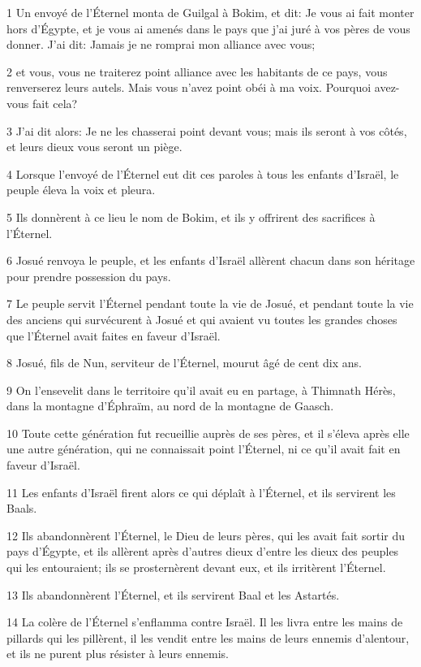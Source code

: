\par 1 Un envoyé de l'Éternel monta de Guilgal à Bokim, et dit: Je vous ai fait monter hors d'Égypte, et je vous ai amenés dans le pays que j'ai juré à vos pères de vous donner. J'ai dit: Jamais je ne romprai mon alliance avec vous;
\par 2 et vous, vous ne traiterez point alliance avec les habitants de ce pays, vous renverserez leurs autels. Mais vous n'avez point obéi à ma voix. Pourquoi avez-vous fait cela?
\par 3 J'ai dit alors: Je ne les chasserai point devant vous; mais ils seront à vos côtés, et leurs dieux vous seront un piège.
\par 4 Lorsque l'envoyé de l'Éternel eut dit ces paroles à tous les enfants d'Israël, le peuple éleva la voix et pleura.
\par 5 Ils donnèrent à ce lieu le nom de Bokim, et ils y offrirent des sacrifices à l'Éternel.
\par 6 Josué renvoya le peuple, et les enfants d'Israël allèrent chacun dans son héritage pour prendre possession du pays.
\par 7 Le peuple servit l'Éternel pendant toute la vie de Josué, et pendant toute la vie des anciens qui survécurent à Josué et qui avaient vu toutes les grandes choses que l'Éternel avait faites en faveur d'Israël.
\par 8 Josué, fils de Nun, serviteur de l'Éternel, mourut âgé de cent dix ans.
\par 9 On l'ensevelit dans le territoire qu'il avait eu en partage, à Thimnath Hérès, dans la montagne d'Éphraïm, au nord de la montagne de Gaasch.
\par 10 Toute cette génération fut recueillie auprès de ses pères, et il s'éleva après elle une autre génération, qui ne connaissait point l'Éternel, ni ce qu'il avait fait en faveur d'Israël.
\par 11 Les enfants d'Israël firent alors ce qui déplaît à l'Éternel, et ils servirent les Baals.
\par 12 Ils abandonnèrent l'Éternel, le Dieu de leurs pères, qui les avait fait sortir du pays d'Égypte, et ils allèrent après d'autres dieux d'entre les dieux des peuples qui les entouraient; ils se prosternèrent devant eux, et ils irritèrent l'Éternel.
\par 13 Ils abandonnèrent l'Éternel, et ils servirent Baal et les Astartés.
\par 14 La colère de l'Éternel s'enflamma contre Israël. Il les livra entre les mains de pillards qui les pillèrent, il les vendit entre les mains de leurs ennemis d'alentour, et ils ne purent plus résister à leurs ennemis.
